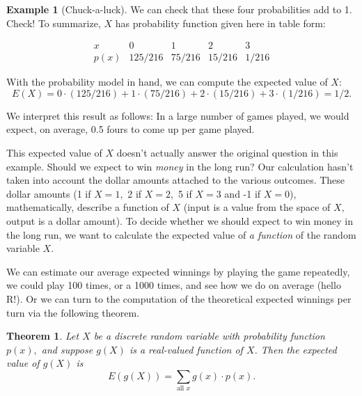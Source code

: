 \documentclass[
]{book}
\newtheorem{theorem}{Theorem}[chapter]
\theoremstyle{definition}
\theoremstyle{definition}
\newtheorem{example}{Example}[chapter]
\theoremstyle{definition}
\theoremstyle{definition}
\theoremstyle{remark}
\begin{document}
\begin{example}[Chuck-a-luck]
We can check that these four probabilities add to 1. Check! To summarize, \(X\) has probability function given here in table form:

\[
\begin{array}{c|c|c|c|c}
x & 0 & 1 & 2 & 3 \\ \hline
p(x) & 125/216 & 75/216 & 15/216 & 1/216 
\end{array}
\]

With the probability model in hand, we can compute the expected value of \(X\): \[E(X) = 0 \cdot (125/216) + 1 \cdot (75/216) + 2 \cdot (15/216) + 3 \cdot (1/216) = 1/2.\]

We interpret this result as follows: In a large number of games played, we would expect, on average, 0.5 fours to come up per game played.

This expected value of \(X\) doesn't actually answer the original question in this example. Should we expect to win \emph{money} in the long run? Our calculation hasn't taken into account the dollar amounts attached to the various outcomes. These dollar amounts (1 if \(X = 1,\) 2 if \(X = 2,\) 5 if \(X = 3\) and -1 if \(X = 0\)), mathematically, describe a function of \(X\) (input is a value from the space of \(X,\) output is a dollar amount). To decide whether we should expect to win money in the long run, we want to calculate the expected value of \emph{a function} of the random variable \(X\).

We can estimate our average expected winnings by playing the game repeatedly, we could play 100 times, or a 1000 times, and see how we do on average (hello R!). Or we can turn to the computation of the theoretical expected winnings per turn via the following theorem.
\end{example}

\begin{theorem}
\protect\hypertarget{thm:EV-discrete-fcnRV}{}\label{thm:EV-discrete-fcnRV}Let \(X\) be a discrete random variable with probability function \(p(x),\) and suppose \(g(X)\) is a real-valued function of \(X\). Then the expected value of \(g(X)\) is \[E(g(X)) = \sum_{\text{all }x} g(x) \cdot p(x).\]
\end{theorem}
\end{document}
